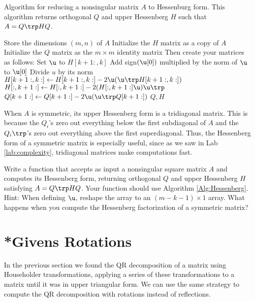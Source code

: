 \begin{algorithm}
\caption{Algorithm for reducing a nonsingular matrix $A$ to Hessenburg form. 
This algorithm returns orthogonal $Q$ and upper Hessenberg $H$ such that $A = Q\trp HQ$.}
\label{Alg:Hessenberg}
\begin{algorithmic}[1]
\State Store the dimensions $(m,n)$ of $A$
\State Initialize the $H$ matrix as a copy of $A$
\State Initialize the $Q$ matrix as the $m\times m$ identity matrix
\State Then create your matrices as follows:
    \State Set $\u$ to $H[k+1:, k]$ %
    \State Add sign$(\u[0])$ multiplied by the norm of $\u$ to $\u[0]$
    \State Divide $u$ by its norm
    \State $H[k+1:,k:] \gets H[k+1:,k:] - 2\u(\u\trp H[k+1:,k:])$
    \State $H[:,k+1:] \gets H[:,k+1:] - 2(H[:,k+1:] \u) \u\trp$
    \State $Q[k+1:] \gets Q[k+1:] - 2\u(\u\trp Q[k+1:])$
\EndFor
\State {} $Q, H$
\EndProcedure
\end{algorithmic}
\end{algorithm}

When $A$ is symmetric, its upper Hessenberg form is a tridiagonal matrix. 
This is because the $Q_i$'s zero out everything below the first subdiagonal of $A$ and the $Q_i\trp$'s zero out everything above the first superdiagonal.
Thus, the Hessenberg form of a symmetric matrix is especially useful, since as we saw in Lab \ref{lab:complexity}, tridiagonal matrices make computations fast.




\begin{problem}
\label{prob:hessenberg}
Write a function that accepts as input a nonsingular square matrix $A$ and computes its Hessenberg form, returning orthogonal $Q$ and upper Hessenberg $H$ satisfying $A = Q\trp HQ$. 
Your function should use Algorithm \ref{Alg:Hessenberg}. Hint: When defining $\u$, reshape the array to an $(m-k-1) \times 1$ array.  What happens when you compute the Hessenberg factorization of a symmetric matrix?
\end{problem}

\section*{*Givens Rotations}

In the previous section we found the QR decomposition of a matrix using Householder transformations, applying a series of these transformations to a matrix until it was in upper triangular form.
We can use the same strategy to compute the QR decomposition with rotations instead of reflections.

